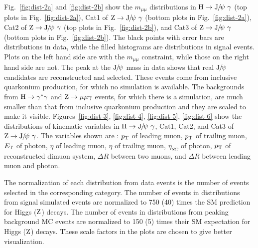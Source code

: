 		Fig.~\ref{fig:dist-2a} and \ref{fig:dist-2b} show the $m_{\mu\mu}$ distributions in $\mathrm{H}\to{\mathrm{J}\hspace{-.08em}/\hspace{-.14em}\psi}\ \gamma$ (top plots in Fig.~\ref{fig:dist-2a}), Cat1 of $\mathrm{Z}\to{\mathrm{J}\hspace{-.08em}/\hspace{-.14em}\psi}\ \gamma$ (bottom plots in Fig.~\ref{fig:dist-2a}), Cat2 of $\mathrm{Z}\to{\mathrm{J}\hspace{-.08em}/\hspace{-.14em}\psi}\ \gamma$ (top plots in Fig.~\ref{fig:dist-2b}), and Cat3 of $\mathrm{Z}\to{\mathrm{J}\hspace{-.08em}/\hspace{-.14em}\psi}\ \gamma$ (bottom plots in Fig.~\ref{fig:dist-2b}). The black points with error bars are distributions in data, while the filled histograms are distributions in signal events. Plots on the left hand side are with the $m_{\mu\mu}$ constraint, while those on the right hand side are not.  
		The peak at the ${\mathrm{J}\hspace{-.08em}/\hspace{-.14em}\psi}$ mass in data shows that real ${\mathrm{J}\hspace{-.08em}/\hspace{-.14em}\psi}$ candidates are reconstructed and selected. These events come from inclusive quarkonium production, for which no simulation is available. The backgrounds from $\mathrm{H}\to\gamma^{*}\gamma$ and $\mathrm{Z}\to\mu\mu\gamma$ events, for which there is a simulation, are much smaller than that from inclusive quarkonium production and they are scaled to make it visible.
		Figures~\ref{fig:dist-3}, \ref{fig:dist-4}, \ref{fig:dist-5}, \ref{fig:dist-6} show the distributions of kinematic variables in $\mathrm{H}\to{\mathrm{J}\hspace{-.08em}/\hspace{-.14em}\psi}\ \gamma$, Cat1, Cat2, and Cat3 of $\mathrm{Z}\to{\mathrm{J}\hspace{-.08em}/\hspace{-.14em}\psi}\ \gamma$. The variables shown are : $p_{\mathrm{T}}$ of leading muon, $p_{\mathrm{T}}$ of trailing muon, $E_{\mathrm{T}}$ of photon, $\eta$ of leading muon, $\eta$ of trailing muon, $\eta_{SC}$ of photon, $p_{\mathrm{T}}$ of reconstructed dimuon system, $\Delta R$ between two muons, and $\Delta R$ between leading muon and photon.
		
		The normalization of each distribution from data events is the number of events selected in the corresponding category. The number of events in distributions from signal simulated events are normalized to 750 (40) times the SM prediction for Higgs ($\mathrm{Z}$) decays. The number of events in distributions from peaking background MC events are normalized to 150 (5) times their SM expectation for Higgs ($\mathrm{Z}$) decays. These scale factors in the plots are chosen to give better visualization.
	

